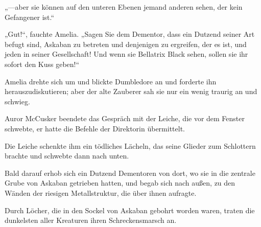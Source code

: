 „—aber sie können auf den unteren Ebenen jemand anderen sehen, der kein Gefangener ist.“

„Gut!“, fauchte Amelia. „Sagen Sie dem Dementor, dass ein Dutzend seiner Art befugt sind, Askaban zu betreten und denjenigen zu ergreifen, der es ist, und jeden in seiner Gesellschaft! Und wenn sie Bellatrix Black sehen, sollen sie ihr sofort den Kuss geben!“

Amelia drehte sich um und blickte Dumbledore an und forderte ihn herauszudiskutieren; aber der alte Zauberer sah sie nur ein wenig traurig an und schwieg.

\later

Auror McCusker beendete das Gespräch mit der Leiche, die vor dem Fenster schwebte, er hatte die Befehle der Direktorin übermittelt.

Die Leiche schenkte ihm ein tödliches Lächeln, das seine Glieder zum Schlottern brachte und schwebte dann nach unten.

Bald darauf erhob sich ein Dutzend Dementoren von dort, wo sie in die zentrale Grube von Askaban getrieben hatten, und begab sich nach außen, zu den Wänden der riesigen Metallstruktur, die über ihnen aufragte.

Durch Löcher, die in den Sockel von Askaban gebohrt worden waren, traten die dunkelsten aller Kreaturen ihren Schreckensmarsch an.

